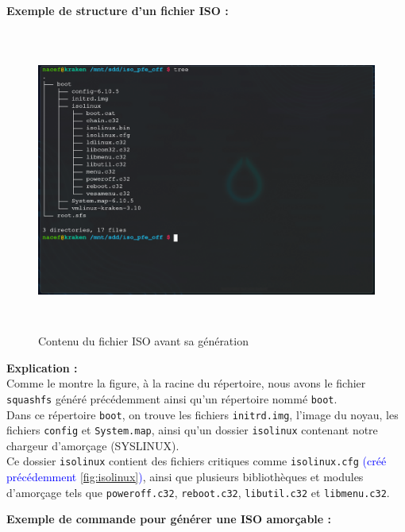 \medskip
\clearpage
\textbf{Exemple de structure d'un fichier ISO :}

\begin{figure}[H]
  \centering
  \includegraphics[width=1\textwidth, height=10cm]{images_pfe/isocontent.png}
  \caption{Contenu du fichier ISO avant sa génération}
  \label{fig:iso_directory_content}
\end{figure}

\medskip

\textbf{Explication :}\\
Comme le montre la figure, à la racine du répertoire, nous avons le fichier \texttt{squashfs} généré précédemment ainsi qu'un répertoire nommé \texttt{boot}.\\
Dans ce répertoire \texttt{boot}, on trouve les fichiers \texttt{initrd.img}, l’image du noyau, les fichiers \texttt{config} et \texttt{System.map}, ainsi qu’un dossier \texttt{isolinux} contenant notre chargeur d’amorçage (SYSLINUX).\\
Ce dossier \texttt{isolinux} contient des fichiers critiques comme \texttt{isolinux.cfg} \textcolor{blue}{(créé précédemment \ref{fig:isolinux})}, ainsi que plusieurs bibliothèques et modules d’amorçage tels que \texttt{poweroff.c32}, \texttt{reboot.c32}, \texttt{libutil.c32} et \texttt{libmenu.c32}.

\medskip
\bigbreak

\textbf{Exemple de commande pour générer une ISO amorçable :}

